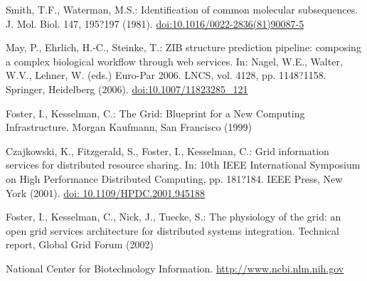 \documentclass{svproc}
\begin{document}
%
\begin{thebibliography}{6}
%

Smith, T.F., Waterman, M.S.: Identification of common molecular subsequences.
J. Mol. Biol. 147, 195?197 (1981). \url{doi:10.1016/0022-2836(81)90087-5}

May, P., Ehrlich, H.-C., Steinke, T.: ZIB structure prediction pipeline:
composing a complex biological workflow through web services.
In: Nagel, W.E., Walter, W.V., Lehner, W. (eds.) Euro-Par 2006.
LNCS, vol. 4128, pp. 1148?1158. Springer, Heidelberg (2006).
\url{doi:10.1007/11823285_121}

Foster, I., Kesselman, C.: The Grid: Blueprint for a New Computing Infrastructure.
Morgan Kaufmann, San Francisco (1999)

Czajkowski, K., Fitzgerald, S., Foster, I., Kesselman, C.: Grid information services
for distributed resource sharing. In: 10th IEEE International Symposium
on High Performance Distributed Computing, pp. 181?184. IEEE Press, New York (2001).
\url{doi: 10.1109/HPDC.2001.945188}

Foster, I., Kesselman, C., Nick, J., Tuecke, S.: The physiology of the grid: an open grid services architecture for distributed systems integration. Technical report, Global Grid
Forum (2002)

National Center for Biotechnology Information. \url{http://www.ncbi.nlm.nih.gov}


\end{thebibliography}
\end{document}

